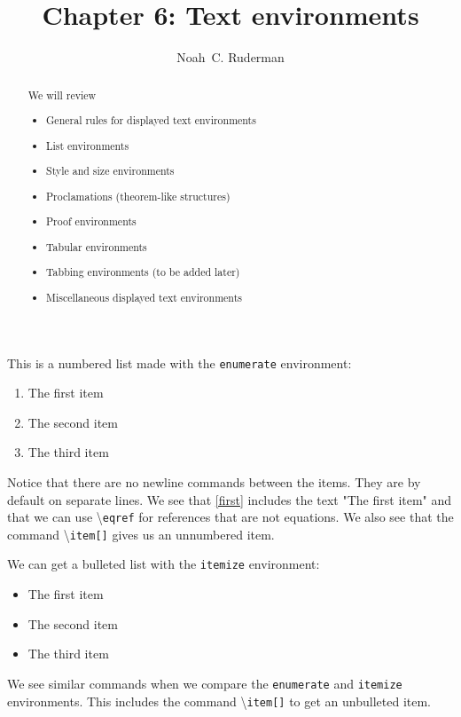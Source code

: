\documentclass[12pt]{amsart}
\theoremstyle{plain}
\newtheorem{name of environment}{Typeset Proclamation} %
\newtheorem*{no numbering}{No Numbering}
\theoremstyle{definition}
\theoremstyle{remark}
\begin{document}
	\title{Chapter 6: Text environments}
	\author[N.\, C. Ruderman]{Noah~C. Ruderman}

	\begin{abstract}
		We will review
		\begin{center}
		\begin{itemize}
			\item General rules for displayed text environments
			\item List environments
			\item Style and size environments
			\item Proclamations (theorem-like structures)
			\item Proof environments
			\item Tabular environments
			\item Tabbing environments (to be added later)
			\item Miscellaneous displayed text environments
		\end{itemize}
		\end{center}
	\end{abstract}

	\maketitle 

This is a numbered list made with the \texttt{enumerate} environment:
\begin{enumerate}
\item The first item \label{first}
\item The second item \label{second}
\item[] The third item
\end{enumerate}
Notice that there are no newline commands between the items. They are by default on separate lines. We see that \eqref{first} includes the text "The first item" and that we can use \textbackslash \texttt{eqref} for references that are not equations. We also see that the command \textbackslash \texttt{item[]} gives us an unnumbered item.
\vspace{12pt}

We can get a bulleted list with the \texttt{itemize} environment: 
\begin{itemize}
\item The first item
\item The second item
\item[] The third item
\end{itemize}
We see similar commands when we compare the \texttt{enumerate} and \texttt{itemize} environments. This includes the command \textbackslash \texttt{item[]} to get an unbulleted item. 
\end{document}
